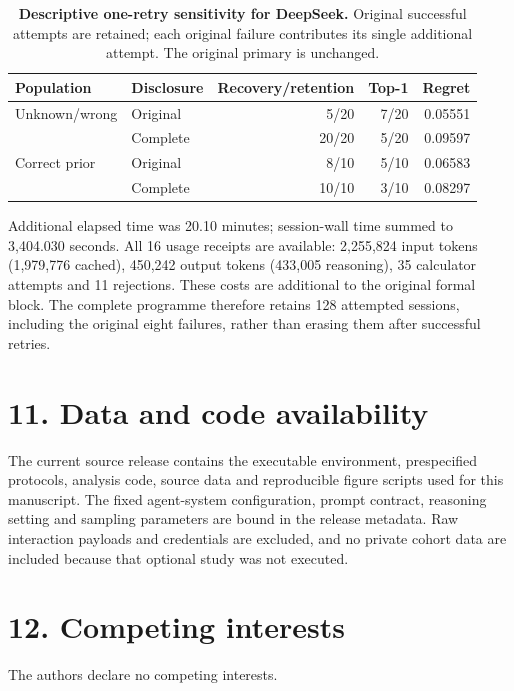 \documentclass[10pt,twocolumn]{article}
\begin{document}
\begin{table}[t]
\centering
\small
\caption{\textbf{Descriptive one-retry sensitivity for DeepSeek.} Original successful attempts are retained; each original failure contributes its single additional attempt. The original primary is unchanged.}
\begin{tabular}{@{}llrrr@{}}
\toprule
Population & Disclosure & Recovery/retention & Top-1 & Regret \\
\midrule
Unknown/wrong & Original & 5/20 & 7/20 & 0.05551 \\
 & Complete & 20/20 & 5/20 & 0.09597 \\
Correct prior & Original & 8/10 & 5/10 & 0.06583 \\
 & Complete & 10/10 & 3/10 & 0.08297 \\
\bottomrule
\end{tabular}
\end{table}

Additional elapsed time was 20.10 minutes; session-wall time summed to
3,404.030 seconds. All 16 usage receipts are available: 2,255,824 input
tokens (1,979,776 cached), 450,242 output tokens (433,005 reasoning), 35
calculator attempts and 11 rejections. These costs are additional to the
original formal block. The complete programme therefore retains 128
attempted sessions, including the original eight failures, rather than
erasing them after successful retries.

\section{11. Data and code
availability}\label{data-and-code-availability}

The current source release contains the executable environment,
prespecified protocols, analysis code, source data and reproducible
figure scripts used for this manuscript. The fixed agent-system
configuration, prompt contract, reasoning setting and sampling
parameters are bound in the release metadata. Raw interaction payloads
and credentials are excluded, and no private cohort data are included
because that optional study was not executed.

\section{12. Competing interests}\label{competing-interests}

The authors declare no competing interests.



\end{document}
